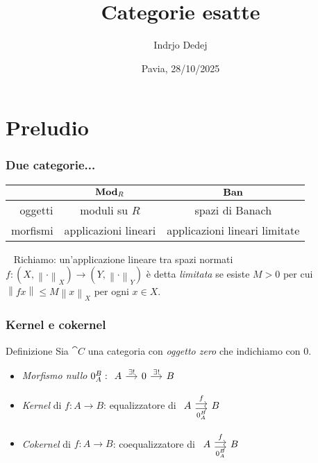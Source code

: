 \documentclass{beamer}
\title{Categorie esatte}
\author{Indrjo Dedej}
\institute[UNIPV]{Università degli Studi di Pavia}
\date{Pavia, 28/10/2025}
\begin{document}
\maketitle

\section{Preludio}

\begin{frame}[fragile]
  \frametitle{Due categorie...}
  \begin{tabular}{r|cc}
    & \(\mathbf{Mod}_R\) & \(\mathbf{Ban}\) \\
    \midrule
    oggetti & moduli su \(R\) & spazi di Banach \\
    morfismi & applicazioni lineari & applicazioni lineari limitate
  \end{tabular}

  ~\vfill
  Richiamo: un'applicazione lineare tra spazi normati
  \(f : (X, \left\lVert \cdot \right\rVert_X) \to (Y, \left\lVert \cdot
  \right\rVert_Y)\) è detta {\em limitata} se esiste \(M > 0\) per cui
  \(\left\lVert f x \right\rVert \le M \left\lVert x \right\rVert_X\) per
  ogni \(x \in X\).
\end{frame}

\begin{frame}[fragile]
  \frametitle{Kernel e cokernel}

\begin{block}{Definizione}
  Sia \(\cat C\) una categoria con {\em oggetto zero} che indichiamo con
  \(0\).
  \begin{itemize}
  \item {\em Morfismo nullo}
    \(0_A^B : \begin{tikzcd}[column sep=small] A \ar["{\exists!}", r] & 0
      \ar["{\exists!}", r] & B \end{tikzcd}\)
  \item {\em Kernel} di \(f : A \to B\): equalizzatore di
    \(\begin{tikzcd}[column sep=small] A \ar["f", shift left, r]
      \ar["{0_A^B}", shift right, swap, r] & B \end{tikzcd}\)
  
  \item {\em Cokernel} di \(f : A \to B\): coequalizzatore di
    \(\begin{tikzcd}[column sep=small] A \ar["f", shift left, r]
      \ar["{0_A^B}", shift right, swap, r] & B \end{tikzcd}\)
  \end{itemize}
  
\end{block}
\end{frame}
\end{document}

